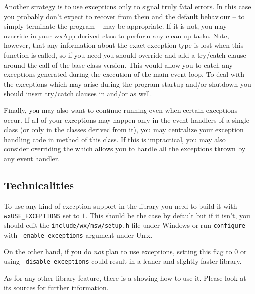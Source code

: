 Another strategy is to use exceptions only to signal truly fatal errors. In
this case you probably don't expect to recover from them and the default
behaviour -- to simply terminate the program -- may be appropriate. If it is
not, you may override  
in your wxApp-derived class to perform any clean up tasks. Note, however, that
any information about the exact exception type is lost when this function is
called, so if you need you should override  and
add a try/catch clause around the call of the base class version. This would
allow you to catch any exceptions generated during the execution of the main
event loop. To deal with the exceptions which may arise during the program
startup and/or shutdown you should insert try/catch clauses in 
 and/or  as well.

Finally, you may also want to continue running even when certain exceptions
occur. If all of your exceptions may happen only in the event handlers of a
single class (or only in the classes derived from it), you may centralize your
exception handling code in  
method of this class. If this is impractical, you may also consider overriding
the  which allows you to handle
all the exceptions thrown by any event handler.


\subsection{Technicalities}

To use any kind of exception support in the library you need to build it with 
\texttt{wxUSE\_EXCEPTIONS} set to $1$. This should be the case by default but
if it isn't, you should edit the \texttt{include/wx/msw/setup.h} file under
Windows or run \texttt{configure} with \texttt{--enable-exceptions} argument
under Unix.

On the other hand, if you do \emph{not} plan to use exceptions, setting this
flag to $0$ or using \texttt{--disable-exceptions} could result in a leaner and
slightly faster library.

As for any other library feature, there is a  
showing how to use it. Please look at its sources for further information.


